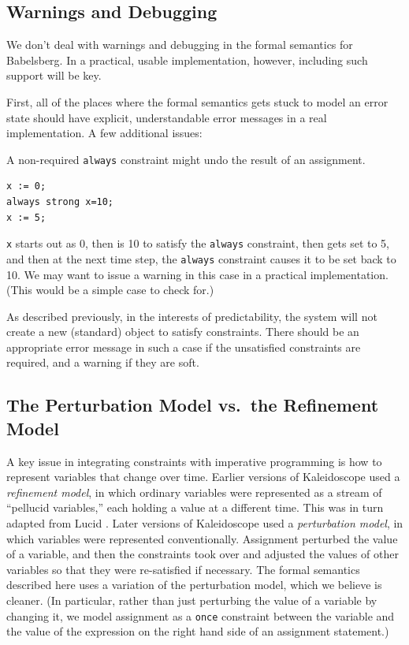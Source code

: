 \documentclass{article}
\begin{document}
\subsection{Warnings and Debugging}
\label{sec:warnings-and-debugging}

We don't deal with warnings and debugging in the formal semantics for
Babelsberg.  In a practical, usable implementation, however, including
such support will be key.

First, all of the places where the formal semantics gets stuck to
model an error state should have explicit, understandable error
messages in a real implementation.  A few additional issues:

A non-required \verb|always| constraint might undo the result of an
assignment.

\begin{verbatim}
x := 0;
always strong x=10;
x := 5;
\end{verbatim}

\verb|x| starts out as 0, then is 10 to satisfy the \verb|always|
constraint, then gets set to 5, and then at the next time step, the
\verb|always| constraint causes it to be set back to 10.  We may want
to issue a warning in this case in a practical implementation.  (This
would be a simple case to check for.)

As described previously, in the interests of predictability, the
system will not create a new (standard) object to satisfy constraints.
There should be an appropriate error message in such a case if the
unsatisfied constraints are required, and a warning if they are soft.

\subsection{The Perturbation Model vs.\ the Refinement Model}
\label{sec:perturbation-vs-refinement}

A key issue in integrating constraints with imperative programming is
how to represent variables that change over time.  Earlier versions of
Kaleidoscope
\cite{freeman-benson-phd,freeman-benson-iccl-1992,freeman-benson-ecoop-1992}
used a \emph{refinement model}, in which ordinary variables were
represented as a stream of ``pellucid variables,'' each holding a
value at a different time.  This was in turn adapted from Lucid
\cite{ashcroft-cacm-1977}.  Later versions of Kaleidoscope
\cite{lopez-ecoop-1994} used a \emph{perturbation model}, in which
variables were represented conventionally.  Assignment perturbed the
value of a variable, and then the constraints took over and adjusted
the values of other variables so that they were re-satisfied if
necessary.  The formal semantics described here uses a variation of
the perturbation model, which we believe is cleaner.  (In particular,
rather than just perturbing the value of a variable by changing it, we
model assignment as a \verb|once| constraint between the variable and
the value of the expression on the right hand side of an assignment
statement.)
\end{document}
